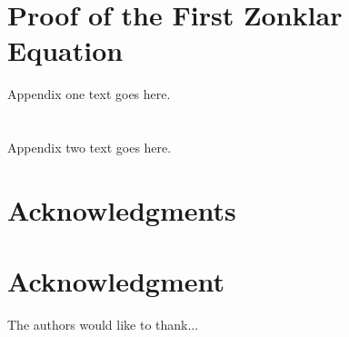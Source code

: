 \documentclass[10pt,journal,compsoc]{IEEEtran}
\begin{document}
%


\appendices
\section{Proof of the First Zonklar Equation}
Appendix one text goes here.

\section{}
Appendix two text goes here.


\ifCLASSOPTIONcompsoc
  \section*{Acknowledgments}
\else
  \section*{Acknowledgment}
\fi


The authors would like to thank...


\ifCLASSOPTIONcaptionsoff
  \newpage
\fi



\end{document}
